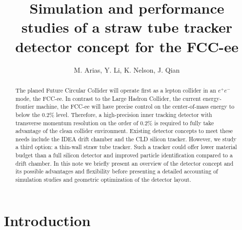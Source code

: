 \documentclass{cernrep}
\begin{document}
\title{Simulation and performance studies of a straw tube tracker detector concept for the FCC-ee}
\author{M. Arias, Y. Li, K. Nelson, J. Qian}


\begin{abstract}
The planed Future Circular Collider will operate first as a lepton collider in an $e^+e^-$ mode, the FCC-ee.
In contrast to the Large Hadron Collider, the current energy-frontier machine, the FCC-ee will have precise control on the center-of-mass energy to below the 0.2\% level.
Therefore, a high-precision inner tracking detector with transverse momentum resolution on the order of 0.2\% is required to fully take advantage of the clean collider environment.
Existing detector concepts to meet these needs include the IDEA drift chamber and the CLD silicon tracker.
However, we study a third option: a thin-wall straw tube tracker.
Such a tracker could offer lower material budget than a full silicon detector and improved particle identification compared to a drift chamber.
In this note we briefly present an overview of the detector concept and its possible advantages and flexibility before presenting a detailed accounting of simulation studies and geometric optimization of the detector layout.
\end{abstract}


\maketitle

\section{Introduction}




\printbibliography
\end{document}
